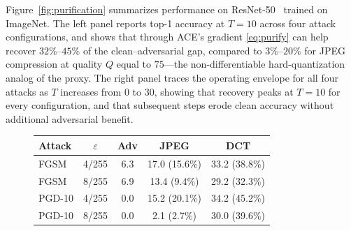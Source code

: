 \documentclass{article}
\theoremstyle{definition}
\begin{document}
Figure~\ref{fig:purification} summarizes performance on ResNet-50~\citep{he2016resnet} trained on ImageNet.
The left panel reports top-1 accuracy at $T=10$ across four attack configurations, and shows that through ACE's gradient \eqref{eq:purify} can help recover $32\%$--$45\%$ of the clean--adversarial gap, compared to $3\%$--$20\%$ for JPEG compression at quality $Q$ equal to $75$---the non-differentiable hard-quantization analog of the proxy.
The right panel traces the operating envelope for all four attacks as $T$ increases from $0$ to $30$, showing that recovery peaks at $T=10$ for every configuration, and that subsequent steps erode clean accuracy without additional adversarial benefit.

\begin{figure}[ht]
  \centering
  \begin{minipage}[t]{0.46\linewidth}
    \centering
    \vspace{0pt}
    \scriptsize
    \begin{tabular}{lcccc}
      \toprule
      Attack & $\varepsilon$ & Adv & JPEG & DCT \\
      \midrule
      FGSM   & 4/255 & 6.3 & 17.0 (15.6\%) & 33.2 (38.8\%) \\
      FGSM   & 8/255 & 6.9 & 13.4 (9.4\%) & 29.2 (32.3\%) \\
      PGD-10 & 4/255 & 0.0 & 15.2 (20.1\%) & 34.2 (45.2\%) \\
      PGD-10 & 8/255 & 0.0 & 2.1 (2.7\%) & 30.0 (39.6\%) \\
      \bottomrule
    \end{tabular}
  \end{minipage}%
  \hfill
  \begin{minipage}[t]{0.51\linewidth}
    \centering
    \vspace{0pt}
\end{minipage}
\end{figure}
\end{document}
